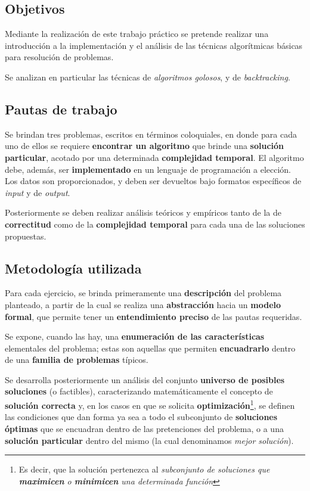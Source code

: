 \documentclass[11pt, a4paper, twoside]{article}
\begin{document}
{}

\subsection{Objetivos}
Mediante la realización de este trabajo práctico se pretende realizar una introducción a la implementación y el análisis de las técnicas algorítmicas básicas para resolución de problemas. 

Se analizan en particular las técnicas de \textit{algoritmos golosos}, y de \textit{backtracking}.

\subsection{Pautas de trabajo}
Se brindan tres problemas, escritos en términos coloquiales, en donde para cada uno de ellos se requiere \textbf{encontrar un algoritmo} que brinde una \textbf{solución particular}, acotado por una determinada \textbf{complejidad temporal}. El algoritmo debe, además, ser \textbf{implementado} en un lenguaje de programación a elección. Los datos son proporcionados, y deben ser devueltos bajo formatos específicos de \textit{input} y de \textit{output}.

Posteriormente se deben realizar análisis teóricos y empíricos tanto de la de \textbf{correctitud} como de la \textbf{complejidad temporal} para cada una de las soluciones propuestas.

\subsection{Metodología utilizada}
Para cada ejercicio, se brinda primeramente una \textbf{descripción} del problema planteado, a partir de la cual se realiza una \textbf{abstracción} hacia un \textbf{modelo formal}, que permite tener un \textbf{entendimiento preciso} de las pautas requeridas. 

Se expone, cuando las hay, una \textbf{enumeración de las características} elementales del problema; estas son aquellas que permiten \textbf{encuadrarlo} dentro de una \textbf{familia de problemas} típicos.

Se desarrolla posteriormente un análisis del conjunto \textbf{universo de posibles soluciones} (o factibles), caracterizando matemáticamente el concepto de \textbf{solución correcta} y, en los casos en que se solicita \textbf{optimización}\footnote{Es decir, que la solución pertenezca al \textit{subconjunto de soluciones que \textbf{maximicen} o \textbf{minimicen} una determinada función}}, se definen las condiciones que dan forma ya sea a todo el subconjunto de \textbf{soluciones óptimas} que se encuadran dentro de las pretenciones del problema, o a una \textbf{solución particular} dentro del mismo (la cual denominamos \textit{mejor solución}).
\end{document}
